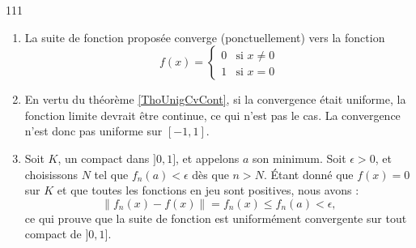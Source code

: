 

\begin{corrige}{111}

%

\begin{enumerate}
\item 

La suite de fonction proposée converge (ponctuellement) vers la fonction
\begin{equation}
	f(x)=
\begin{cases}
	0	&	\text{si }x\neq 0\\
	1	&	 \text{si }x=0
\end{cases}
\end{equation}
\item En vertu du théorème \ref{ThoUnigCvCont}, si la convergence était uniforme, la fonction limite devrait être continue, ce qui n'est pas le cas. La convergence n'est donc pas uniforme sur $[-1,1]$.

\item

Soit $K$, un compact dans $]0,1]$, et appelons $a$ son minimum. Soit $\epsilon>0$, et choisissons $N$ tel que $f_n(a)<\epsilon$ dès que $n>N$. Étant donné que $f(x)=0$ sur $K$ et que toutes les fonctions en jeu sont positives, nous avons :
\begin{equation}
	\| f_n(x)-f(x) \|=f_n(x)\leq f_n(a)<\epsilon,
\end{equation}
ce qui prouve que la suite de fonction est uniformément convergente sur tout compact de $]0,1]$.

\end{enumerate}

\end{corrige}



